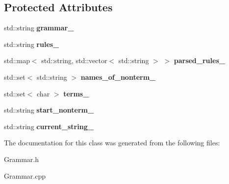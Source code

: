 \subsection*{Protected Attributes}
\begin{DoxyCompactItemize}
\item 
\mbox{\label{class_grammar_ad48a06416c658caaab2c6a7d6c538bd9}} 
std\+::string {\bfseries grammar\+\_\+}
\item 
\mbox{\label{class_grammar_a660a540727807dfd9c3152b245377544}} 
std\+::string {\bfseries rules\+\_\+}
\item 
\mbox{\label{class_grammar_a124b3128fe6b0df7845a5e9fefb1f530}} 
std\+::map$<$ std\+::string, std\+::vector$<$ std\+::string $>$ $>$ {\bfseries parsed\+\_\+rules\+\_\+}
\item 
\mbox{\label{class_grammar_a4f20c5e5df17ca2c5ad53aaec4240b0b}} 
std\+::set$<$ std\+::string $>$ {\bfseries names\+\_\+of\+\_\+nonterm\+\_\+}
\item 
\mbox{\label{class_grammar_a7664c4481949296f8a706de7049a6cf2}} 
std\+::set$<$ char $>$ {\bfseries terms\+\_\+}
\item 
\mbox{\label{class_grammar_af02a912c7e3b2fa19049bf7fb3f4b815}} 
std\+::string {\bfseries start\+\_\+nonterm\+\_\+}
\item 
\mbox{\label{class_grammar_a1be4add6568bdc37256a7affba21fbca}} 
std\+::string {\bfseries current\+\_\+string\+\_\+}
\end{DoxyCompactItemize}


The documentation for this class was generated from the following files\+:\begin{DoxyCompactItemize}
\item 
Grammar.\+h\item 
Grammar.\+cpp\end{DoxyCompactItemize}

